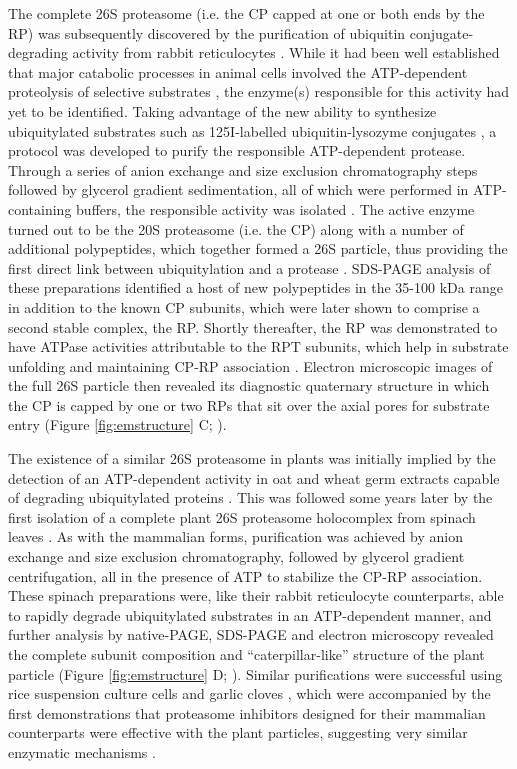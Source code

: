 The complete 26S proteasome (i.e. the CP capped at one or both ends by the RP) was subsequently discovered by the purification of ubiquitin conjugate-degrading activity from rabbit reticulocytes \citep{hough86}.  While it had been well established that major catabolic processes in animal cells involved the ATP-dependent proteolysis of selective substrates \citep{etlinger77}, the enzyme(s) responsible for this activity had yet to be identified.  Taking advantage of the new ability to synthesize ubiquitylated substrates such as 125I-labelled ubiquitin-lysozyme conjugates \citep{hough86-1xVPf}, a protocol was developed to purify the responsible ATP-dependent protease.  Through a series of anion exchange and size exclusion chromatography steps followed by glycerol gradient sedimentation, all of which were performed in ATP-containing buffers, the responsible activity was isolated \citep{hough86, hough87}. The active enzyme turned out to be the 20S proteasome (i.e. the CP) along with a number of additional polypeptides, which together formed a 26S particle, thus providing the first direct link between ubiquitylation and a protease \citep{ganoth88, hough87, waxman87}.  SDS-PAGE analysis of these preparations identified a host of new polypeptides in the 35-100 kDa range in addition to the known CP subunits, which were later shown to comprise a second stable complex, the RP.  Shortly thereafter, the RP was demonstrated to have ATPase activities attributable to the RPT subunits, which help in substrate unfolding and maintaining CP-RP association \citep{armon90}.  Electron microscopic images of the full 26S particle then revealed its diagnostic quaternary structure in which the CP is capped by one or two RPs that sit over the axial pores for substrate entry (Figure \ref{fig:emstructure} C; \citep{peters91, yoshimura93}).

The existence of a similar 26S proteasome in plants was initially implied by the detection of an ATP-dependent activity in oat and wheat germ extracts capable of degrading ubiquitylated proteins \citep{hatfield89, vierstra88}.  This was followed some years later by the first isolation of a complete plant 26S proteasome holocomplex from spinach leaves \citep{fujinami94}.  As with the mammalian forms, purification was achieved by anion exchange and size exclusion chromatography, followed by glycerol gradient centrifugation, all in the presence of ATP to stabilize the CP-RP association.  These spinach preparations were, like their rabbit reticulocyte counterparts, able to rapidly degrade ubiquitylated substrates in an ATP-dependent manner, and further analysis by native-PAGE, SDS-PAGE and electron microscopy revealed the complete subunit composition and “caterpillar-like” structure of the plant particle (Figure \ref{fig:emstructure} D; \citep{fujinami94}).  Similar purifications were successful using rice suspension culture cells and garlic cloves \citep{malik04, yanagawa99}, which were accompanied by the first demonstrations that proteasome inhibitors designed for their mammalian counterparts were effective with the plant particles, suggesting very similar enzymatic mechanisms \citep{ozaki92, woffenden98}.  

